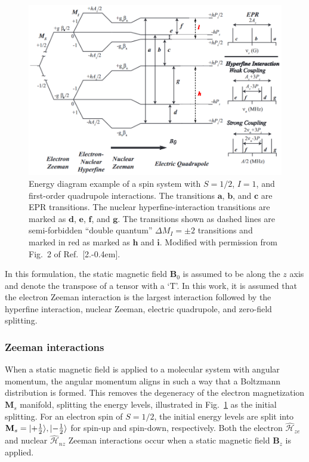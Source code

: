 \begin{figure}[ht]
 \centering
 \includegraphics[width=\textwidth]{Kapitel/Ch2-Images/EnergyDiagram.eps}
 \caption[Energy diagram example with S=1/2 and I=1.]{Energy diagram example of a spin system with $S=1/2$, $I=1$, and first-order quadrupole interactions. The transitions $\mathbf{a}$, $\mathbf{b}$, and $\mathbf{c}$ are EPR transitions. The nuclear hyperfine-interaction transitions are marked as $\mathbf{d}$, $\mathbf{e}$, $\mathbf{f}$, and $\mathbf{g}$. The transitions shown as dashed lines are semi-forbidden ``double quantum'' $\Delta M_I = \pm 2$ transitions and marked in red as marked as $\mathbf{h}$ and $\mathbf{i}$. Modified with permission from Fig.~2 of Ref.~[2.\kern-0.4em].}
 \label{fig:EPREnergy}
\end{figure}

In this formulation, the static magnetic field $\mathbf{B}_0$ is assumed to be along the $z$ axis and denote the transpose of a tensor with a `T'. In this work, it is assumed that the electron Zeeman interaction is the largest interaction followed by the hyperfine interaction, nuclear Zeeman, electric quadrupole, and zero-field splitting.

\subsubsection*{Zeeman interactions}
When a static magnetic field is applied to a molecular system with angular momentum, the angular momentum aligns in such a way that a Boltzmann distribution is formed. This removes the degeneracy of the electron magnetization $\mathbf{M}_s$ manifold, splitting the energy levels, illustrated in Fig.~\ref{fig:EPREnergy} as the initial splitting. For an electron spin of $S = 1/2$, the initial energy levels are split into $\mathbf{M}_s = \lvert+\frac{1}{2}\rangle, \lvert-\frac{1}{2}\rangle$ for spin-up and spin-down, respectively. Both the electron $\hat{\mathcal{H}}_{ze}$ and nuclear $\hat{\mathcal{H}}_{nz}$ Zeeman interactions occur when a static magnetic field $\mathbf{B}_z$ is applied.

